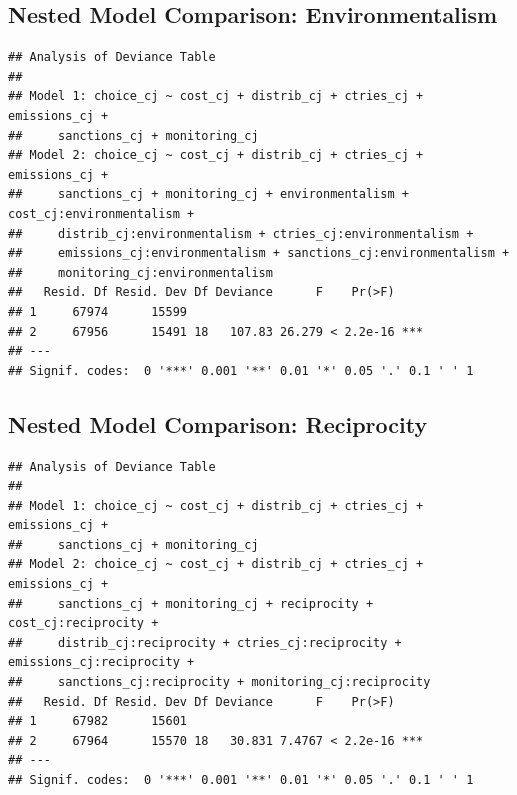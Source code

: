 \documentclass[a4paper,12pt]{article}\usepackage[]{graphicx}\usepackage[]{color}
\makeatletter
\newenvironment{kframe}{%
 \def\at@end@of@kframe{}%
 \ifinner\ifhmode%
  \def\at@end@of@kframe{\end{minipage}}%
  \begin{minipage}{\columnwidth}%
 \fi\fi%
 \def\FrameCommand##1{\hskip\@totalleftmargin \hskip-\fboxsep
 \colorbox{shadecolor}{##1}\hskip-\fboxsep
     \hskip-\linewidth \hskip-\@totalleftmargin \hskip\columnwidth}%
 \MakeFramed {\advance\hsize-\width
   \@totalleftmargin\z@ \linewidth\hsize
   \@setminipage}}%
 {\par\unskip\endMakeFramed%
 \at@end@of@kframe}
\newenvironment{knitrout}{}{} %
\makeatother
\begin{document}
\subsection{Nested Model Comparison: Environmentalism}

\begin{knitrout}
\color{fgcolor}\begin{kframe}
\begin{verbatim}
## Analysis of Deviance Table
## 
## Model 1: choice_cj ~ cost_cj + distrib_cj + ctries_cj + emissions_cj + 
##     sanctions_cj + monitoring_cj
## Model 2: choice_cj ~ cost_cj + distrib_cj + ctries_cj + emissions_cj + 
##     sanctions_cj + monitoring_cj + environmentalism + cost_cj:environmentalism + 
##     distrib_cj:environmentalism + ctries_cj:environmentalism + 
##     emissions_cj:environmentalism + sanctions_cj:environmentalism + 
##     monitoring_cj:environmentalism
##   Resid. Df Resid. Dev Df Deviance      F    Pr(>F)    
## 1     67974      15599                                 
## 2     67956      15491 18   107.83 26.279 < 2.2e-16 ***
## ---
## Signif. codes:  0 '***' 0.001 '**' 0.01 '*' 0.05 '.' 0.1 ' ' 1
\end{verbatim}
\end{kframe}
\end{knitrout}

\clearpage

\subsection{Nested Model Comparison: Reciprocity}

\begin{knitrout}
\color{fgcolor}\begin{kframe}
\begin{verbatim}
## Analysis of Deviance Table
## 
## Model 1: choice_cj ~ cost_cj + distrib_cj + ctries_cj + emissions_cj + 
##     sanctions_cj + monitoring_cj
## Model 2: choice_cj ~ cost_cj + distrib_cj + ctries_cj + emissions_cj + 
##     sanctions_cj + monitoring_cj + reciprocity + cost_cj:reciprocity + 
##     distrib_cj:reciprocity + ctries_cj:reciprocity + emissions_cj:reciprocity + 
##     sanctions_cj:reciprocity + monitoring_cj:reciprocity
##   Resid. Df Resid. Dev Df Deviance      F    Pr(>F)    
## 1     67982      15601                                 
## 2     67964      15570 18   30.831 7.4767 < 2.2e-16 ***
## ---
## Signif. codes:  0 '***' 0.001 '**' 0.01 '*' 0.05 '.' 0.1 ' ' 1
\end{verbatim}
\end{kframe}
\end{knitrout}
\end{document}

